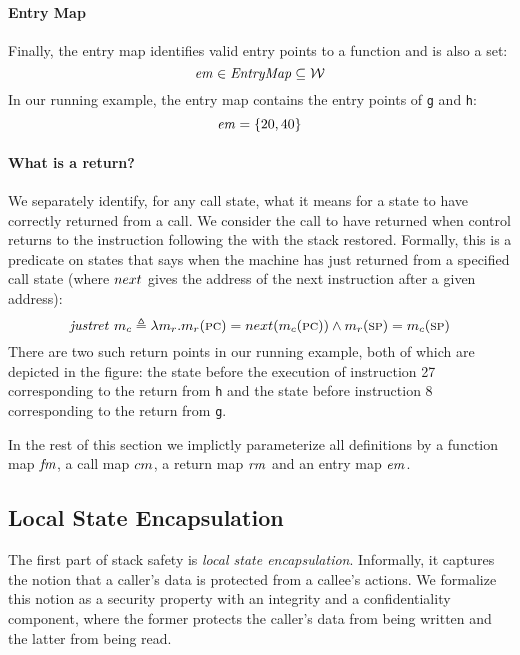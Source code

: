\documentclass[acmsmall,review,anonymous]{acmart}\settopmatter{printfolios=true,printccs=false,printacmref=false}
\begin{document}
\paragraph*{Entry Map}
Finally, the entry map identifies valid entry points to a
function and is also a set:
\[\mathit{em} \in \mathit{EntryMap} \subseteq {\mathcal W}\]
%
In our running example, the entry map contains the entry
points of {\tt g} and {\tt h}:
\[ \mathit{em} = \{20, 40\} \]

\paragraph*{What is a return?}

We separately identify, for any call state, what it means for a state
to have correctly returned from a call. We consider the call to have
returned when control returns to the instruction following
the \jal with the stack restored. Formally, this is a predicate on
states that says when the machine has just returned from a specified call state
(where $next$ gives the address of the next instruction after a given address):
\[%
    \ret{\mach_c} \triangleq  \lambda \mach_r . \mach_r(\PCname) =
    \nextPC(\mach_c(\PCname)) \land  \mach_r(\SP) = \mach_c(\SP)
\]
There are two such return points in our running example, both of which
are depicted in the figure: the state before the execution of
instruction 27 corresponding to the return from {\tt h} and the state
before instruction 8 corresponding to the return from {\tt g}.

\medskip

In the rest of this section we implictly parameterize all
definitions by a function map $\mathit{fm}$, a call map $cm$, a return
map $\mathit{rm}$ and an entry map $\mathit{em}$.

\subsection{Local State Encapsulation}
\label{sec:lse}

The first part of stack safety is {\em local state encapsulation}.
Informally, it captures the notion that a caller's data is
protected from a callee's actions. We formalize this notion
as a security property with an integrity and a confidentiality
component, where the former protects the caller's data from being
written and the latter from being read.
\end{document}
